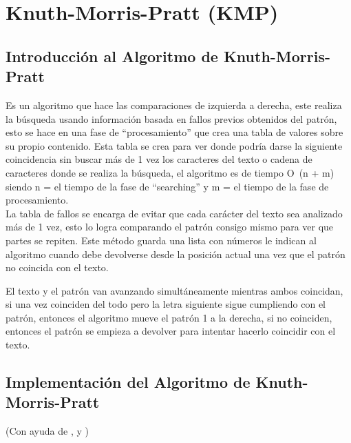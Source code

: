 \section*{Knuth-Morris-Pratt (KMP)}
{}

\subsection*{Introducción al Algoritmo de Knuth-Morris-Pratt}
\quad Es un algoritmo que hace las comparaciones de izquierda a derecha, este realiza la búsqueda usando información basada en fallos previos obtenidos del patrón, esto se hace en una fase de “procesamiento” que crea una tabla de valores sobre su propio contenido. Esta tabla se crea para ver donde podría darse la siguiente coincidencia sin buscar más de 1 vez los caracteres del texto o cadena de caracteres donde se realiza la búsqueda, el algoritmo es de tiempo O~(n + m) siendo n = el tiempo de la fase de “searching” y m = el tiempo de la fase de procesamiento.
\\
\quad La tabla de fallos se encarga de evitar que cada carácter del texto sea analizado más de 1 vez, esto lo logra comparando el patrón consigo mismo para ver que partes se repiten. Este método guarda una lista con números le indican al algoritmo cuando debe devolverse desde la posición actual una vez que el patrón no coincida con el texto.

\quad El texto y el patrón van avanzando simultáneamente mientras ambos coincidan, si una vez coinciden del todo pero la letra siguiente sigue cumpliendo con el patrón, entonces el algoritmo mueve el patrón 1 a la derecha, si no coinciden, entonces el patrón se empieza a devolver para intentar hacerlo coincidir con el texto.

\subsection*{Implementación del Algoritmo de Knuth-Morris-Pratt}
(Con ayuda de \cite{KMP1}, \cite{KMPWiki} y \cite{KMPGFG})

